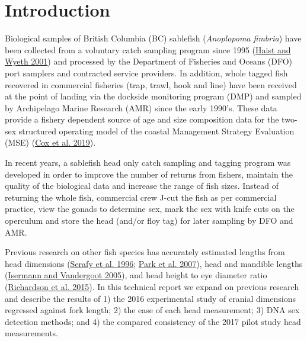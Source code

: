 \documentclass[12pt]{article}\usepackage[]{graphicx}\usepackage[]{color}
\begin{document}

\frontmatter


\renewcommand{\headrulewidth}{0.5pt}  %
\renewcommand{\footrulewidth}{0.5pt}  %

\newcommand{\lt}{\ensuremath <}
\newcommand{\gt}{\ensuremath >}

\newlength{\cslhangindent}
\setlength{\cslhangindent}{1.5em}
\newenvironment{cslreferences}%
  {}%
  {\par}

\hypertarget{introduction}{%
\section{Introduction}\label{introduction}}

Biological samples of British Columbia (BC) sablefish (\emph{Anoplopoma fimbria}) have been collected from a voluntary catch sampling program since 1995 (\protect\hyperlink{ref-Haist2001}{Haist and Wyeth 2001}) and processed by the Department of Fisheries and Oceans (DFO) port samplers and contracted service providers. In addition, whole tagged fish recovered in commercial fisheries (trap, trawl, hook and line) have been received at the point of landing via the dockside monitoring program (DMP) and sampled by Archipelago Marine Research (AMR) since the early 1990's. These data provide a fishery dependent source of age and size composition data for the two-sex structured operating model of the coastal Management Strategy Evaluation (MSE) (\protect\hyperlink{ref-Cox2019}{Cox et al. 2019}).

In recent years, a sablefish head only catch sampling and tagging program was developed in order to improve the number of returns from fishers, maintain the quality of the biological data and increase the range of fish sizes. Instead of returning the whole fish, commercial crew J-cut the fish as per commercial practice, view the gonads to determine sex, mark the sex with knife cuts on the operculum and store the head (and/or floy tag) for later sampling by DFO and AMR.

Previous research on other fish species has accurately estimated lengths from head dimensions (\protect\hyperlink{ref-Serafy1996}{Serafy et al. 1996}; \protect\hyperlink{ref-Park2007}{Park et al. 2007}), head and mandible lengths (\protect\hyperlink{ref-Isermann2005}{Isermann and Vandergoot 2005}), and head height to eye diameter ratio (\protect\hyperlink{ref-Richardson2015}{Richardson et al. 2015}). In this technical report we expand on previous research and describe the results of 1) the 2016 experimental study of cranial dimensions regressed against fork length; 2) the ease of each head measurement; 3) DNA sex detection methods; and 4) the compared consistency of the 2017 pilot study head measurements.
\end{document}
